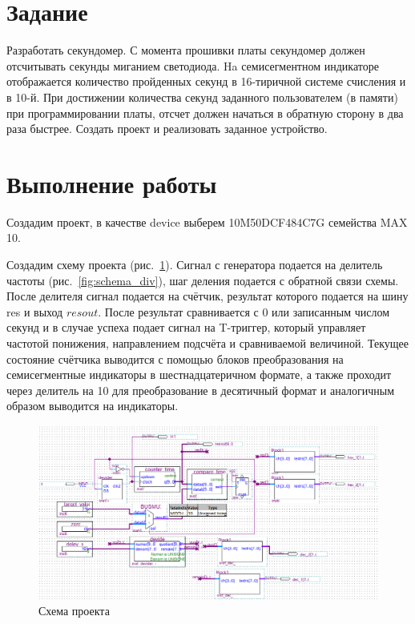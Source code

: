 \documentclass[a4paper,14pt]{article}
\begin{document}

\tableofcontents
\pagebreak

\section{Задание}

Разработать секундомер. 
С момента прошивки платы секундомер должен отсчитывать секунды миганием светодиода.
Ha семисегментном индикаторе отображается количество пройденных секунд в 16-тиричной системе счисления и в 10-й. 
При достижении количества секунд заданного пользователем (в памяти) при программировании платы, отсчет должен начаться в обратную сторону в два раза быстрее. 
Создать проект и реализовать заданное устройство.

\section{Выполнение работы}

Создадим проект, в качестве device выберем 10M50DCF484C7G семейства MAX 10.

Создадим схему проекта (рис.~\ref{fig:schema}).
Сигнал с генератора подается на делитель частоты (рис.~\ref{fig:schema_div}), шаг деления подается с обратной связи схемы. После делителя сигнал подается на счётчик, результат которого подается на шину res и выход $resout$.
После результат сравнивается с 0 или записанным числом секунд и в случае успеха подает сигнал на T-триггер, который управляет частотой понижения, направлением подсчёта и сравниваемой величиной.
Текущее состояние счётчика выводится с помощью блоков преобразования на семисегментные индикаторы в шестнадцатеричном формате, а также проходит через делитель на 10 для преобразование в десятичный формат и аналогичным образом выводится на индикаторы.

\begin{figure}[H]
	\centering
	\includegraphics[width=\linewidth]{image/schema}
	\caption{Схема проекта}
	\label{fig:schema}
\end{figure}
\end{document}

